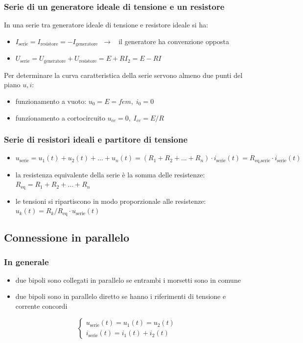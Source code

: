 \documentclass[a4paper]{article}
\begin{document}
\subsubsection*{Serie di un generatore ideale di tensione e un resistore}
In una serie tra generatore ideale di tensione e resistore ideale si ha:
\begin{itemize}
	\item \(I_\text{serie} = I_\text{resistore} = -I_\text{generatore} \;\; \rightarrow \;\;\) il generatore ha convenzione opposta
	\item \(U_\text{serie} = U_\text{generatore} + U_\text{resistore} = E + R I_2 = E - R I\)
\end{itemize}
Per determinare la curva caratteristica della serie servono almeno due punti del piano \(u,i\):
\begin{itemize}
	\item funzionamento a vuoto: \(u_0 = E = fem,\; i_0 = 0\)
	\item funzionamento a cortocircuito \(u_{cc} = 0,\; I_{cc} = E/R\)
\end{itemize}

\subsubsection*{Serie di resistori ideali e partitore di tensione}
\begin{itemize}
	\item \(u_\text{serie} = u_1(t) + u_2(t) + \dots + u_n(t) = (R_1 + R_2 + \dots + R_n) \cdot i_\text{serie}(t) = R_\text{eq,serie} \cdot i_\text{serie}(t)\)
	\item la resistenza equivalente della serie è la somma delle resistenze: \(R_\text{eq} = R_1 + R_2 + \dots + R_n\) 
	\item le tensioni si ripartiscono in modo proporzionale alle resistenze: \(u_k(t) = R_k / R_\text{eq} \cdot u_\text{serie}(t)\)
\end{itemize}

\subsection{Connessione in parallelo}
\subsubsection*{In generale}
\begin{itemize}
	\item due bipoli sono collegati in parallelo se entrambi i morsetti sono in comune
	\item due bipoli sono in parallelo diretto se hanno i riferimenti di tensione e corrente concordi
\end{itemize}
\[\begin{cases} u_\text{serie}(t) = u_1(t) = u_2(t) \\ i_\text{serie}(t) = i_1(t) + i_2(t) \end{cases}\]
\end{document}
